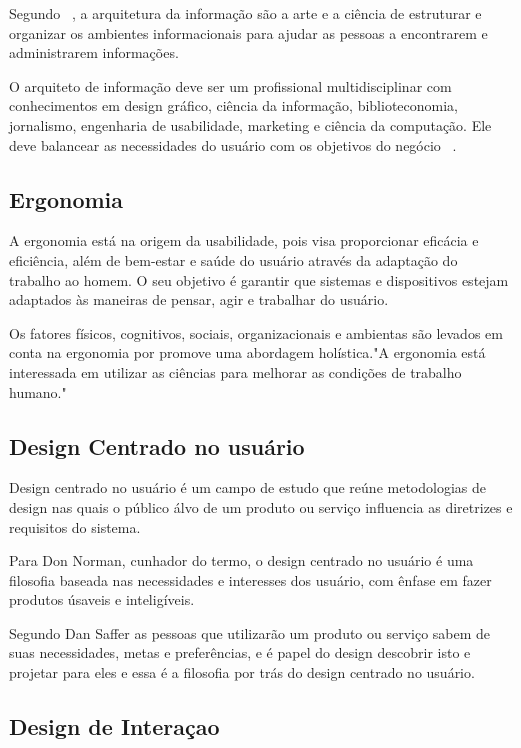 Segundo ~, a arquitetura da informação são a arte e a ciência de estruturar e organizar os ambientes informacionais para ajudar as pessoas a encontrarem e administrarem informações.

O arquiteto de informação deve ser um profissional multidisciplinar com conhecimentos em design gráfico, ciência da informação, biblioteconomia, jornalismo, engenharia de usabilidade, marketing e ciência da computação. Ele deve balancear as necessidades do usuário com os objetivos do negócio ~\cite{rosenfeld1998}.

\subsection{Ergonomia}

A ergonomia está na origem da usabilidade, pois visa proporcionar eficácia e eficiência, além de bem-estar e saúde do usuário através da adaptação do trabalho ao homem. O seu objetivo é garantir que sistemas e dispositivos estejam adaptados às maneiras de pensar, agir e trabalhar do usuário. ~\cite{cybis2010}

	Os fatores físicos, cognitivos, sociais, organizacionais e ambientas são levados em conta na ergonomia por promove uma abordagem holística."A ergonomia está interessada em utilizar as ciências para melhorar as condições de trabalho humano."    

\subsection{Design Centrado no usuário}

	Design centrado no usuário é um campo de estudo que reúne metodologias de design nas quais o público álvo de um produto ou serviço influencia as diretrizes e requisitos do sistema. %
	
	Para Don Norman, cunhador do termo, o design centrado no usuário é uma filosofia baseada nas necessidades e interesses dos usuário, com ênfase em fazer produtos úsaveis e inteligíveis.

	Segundo Dan Saffer as pessoas que utilizarão um produto ou serviço sabem de suas necessidades, metas e preferências, e é papel do design descobrir isto e projetar para eles e essa é a filosofia por trás do design centrado no usuário.
	
\subsection{Design de Interaçao}

